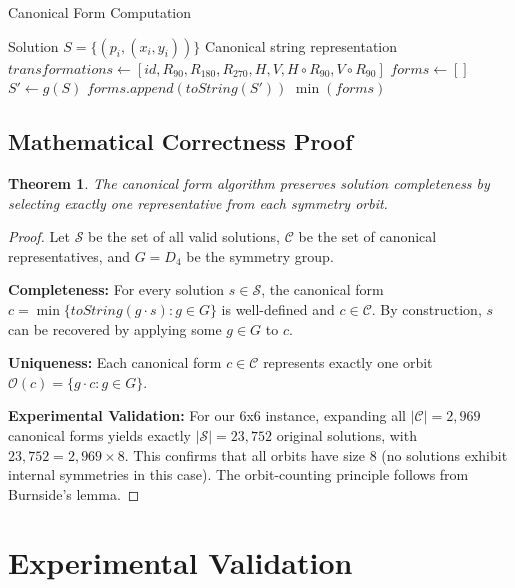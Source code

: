 \documentclass[12pt,a4paper]{article}
\newtheorem{theorem}{Theorem}[section]
\theoremstyle{definition}
\begin{document}
\begin{algorithm}
\caption{Canonical Form Computation}
\begin{algorithmic}[1]
\REQUIRE Solution $S = \{(p_i, (x_i, y_i))\}$
\ENSURE Canonical string representation
\STATE $transformations \leftarrow [id, R_{90}, R_{180}, R_{270}, H, V, H \circ R_{90}, V \circ R_{90}]$
\STATE $forms \leftarrow []$
    \STATE $S' \leftarrow g(S)$
    \STATE $forms.append(toString(S'))$
\ENDFOR
\RETURN $\min(forms)$ 
\end{algorithmic}
\end{algorithm}

\subsection{Mathematical Correctness Proof}

\begin{theorem}
The canonical form algorithm preserves solution completeness by selecting exactly one representative from each symmetry orbit.
\end{theorem}

\begin{proof}
Let $\mathcal{S}$ be the set of all valid solutions, $\mathcal{C}$ be the set of canonical representatives, and $G = D_4$ be the symmetry group.

\textbf{Completeness:} For every solution $s \in \mathcal{S}$, the canonical form $c = \min\{toString(g \cdot s) : g \in G\}$ is well-defined and $c \in \mathcal{C}$. By construction, $s$ can be recovered by applying some $g \in G$ to $c$.

\textbf{Uniqueness:} Each canonical form $c \in \mathcal{C}$ represents exactly one orbit $\mathcal{O}(c) = \{g \cdot c : g \in G\}$.

\textbf{Experimental Validation:} For our 6x6 instance, expanding all $|\mathcal{C}| = 2,969$ canonical forms yields exactly $|\mathcal{S}| = 23,752$ original solutions, with $23,752 = 2,969 \times 8$. This confirms that all orbits have size 8 (no solutions exhibit internal symmetries in this case). The orbit-counting principle follows from Burnside's lemma.
\end{proof}

\section{Experimental Validation}
\end{document}
